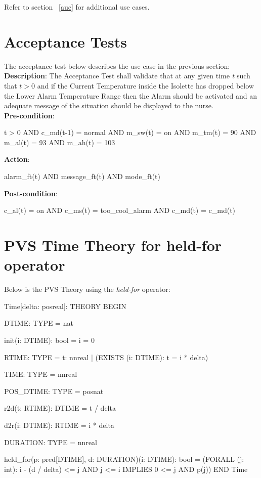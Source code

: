 \documentclass[fontsize=12pt,paper=letter,twoside]{scrartcl}
\begin{document}
\smallskip
\noindent Refer to section ~\ref{auc} for additional use cases.


\newpage
\section{Acceptance Tests}

The acceptance test below describes the use case in the previous section:\\

\smallskip
\noindent \textbf{Description}: The Acceptance Test shall validate that at any given time \emph{t} such that $t > 0$ and if the Current Temperature inside the Isolette has dropped below the Lower Alarm Temperature Range then the Alarm should be activated and an adequate message of the situation should be displayed to the nurse.\\

\smallskip
\noindent \textbf{Pre-condition}: 
\begin{pvs}
	t > 0
	AND c_md(t-1) = normal 
	AND m_sw(t) = on 
	AND m_tm(t) = 90
	AND m_al(t) = 93 
	AND m_ah(t) = 103 
\end{pvs}

\smallskip
\noindent \textbf{Action}: 
\begin{pvs}
	alarm_ft(t)
	AND message_ft(t) 
	AND mode_ft(t) 
\end{pvs}

\smallskip
\noindent \textbf{Post-condition}: 
\begin{pvs}
	c_al(t) = on 
	AND c_ms(t) = too_cool_alarm 
	AND c_md(t) = c_md(t)  
\end{pvs}

\newpage



\newpage
\appendix

\section{PVS Time Theory for held-for operator}

Below is the PVS Theory using the \emph{held-for} operator:\\

\begin{pvs}
Time[delta: posreal]: THEORY
 BEGIN

  DTIME: TYPE = nat

  init(i: DTIME): bool = i = 0

  RTIME: TYPE = {t: nnreal | (EXISTS (i: DTIME): t = i * delta)}

  TIME: TYPE = nnreal

  POS_DTIME: TYPE = posnat

  r2d(t: RTIME): DTIME = t / delta

  d2r(i: DTIME): RTIME = i * delta

  DURATION: TYPE = nnreal

  held_for(p: pred[DTIME], d: DURATION)(i: DTIME): bool =
      (FORALL (j: int):
         i - (d / delta) <= j AND j <= i IMPLIES 0 <= j AND p(j))
 END Time	
\end{pvs}
\end{document}
